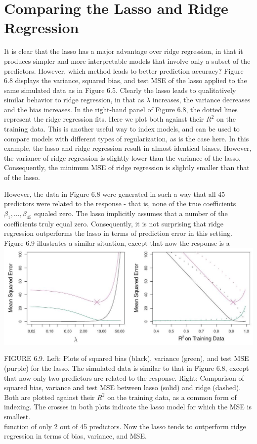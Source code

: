 \documentclass[10pt]{article}
\begin{document}
\section*{Comparing the Lasso and Ridge Regression}
It is clear that the lasso has a major advantage over ridge regression, in that it produces simpler and more interpretable models that involve only a subset of the predictors. However, which method leads to better prediction accuracy? Figure 6.8 displays the variance, squared bias, and test MSE of the lasso applied to the same simulated data as in Figure 6.5. Clearly the lasso leads to qualitatively similar behavior to ridge regression, in that as $\lambda$ increases, the variance decreases and the bias increases. In the right-hand panel of Figure 6.8, the dotted lines represent the ridge regression fits. Here we plot both against their $R^{2}$ on the training data. This is another useful way to index models, and can be used to compare models with different types of regularization, as is the case here. In this example, the lasso and ridge regression result in almost identical biases. However, the variance of ridge regression is slightly lower than the variance of the lasso. Consequently, the minimum MSE of ridge regression is slightly smaller than that of the lasso.

However, the data in Figure 6.8 were generated in such a way that all 45 predictors were related to the response - that is, none of the true coefficients $\beta_{1}, \ldots, \beta_{45}$ equaled zero. The lasso implicitly assumes that a number of the coefficients truly equal zero. Consequently, it is not surprising that ridge regression outperforms the lasso in terms of prediction error in this setting. Figure 6.9 illustrates a similar situation, except that now the response is a\\
\includegraphics[max width=\textwidth, center]{2025_05_05_efe77898333945044de4g-239}

FIGURE 6.9. Left: Plots of squared bias (black), variance (green), and test MSE (purple) for the lasso. The simulated data is similar to that in Figure 6.8, except that now only two predictors are related to the response. Right: Comparison of squared bias, variance and test MSE between lasso (solid) and ridge (dashed). Both are plotted against their $R^{2}$ on the training data, as a common form of indexing. The crosses in both plots indicate the lasso model for which the MSE is smallest.\\
function of only 2 out of 45 predictors. Now the lasso tends to outperform ridge regression in terms of bias, variance, and MSE.
\end{document}
